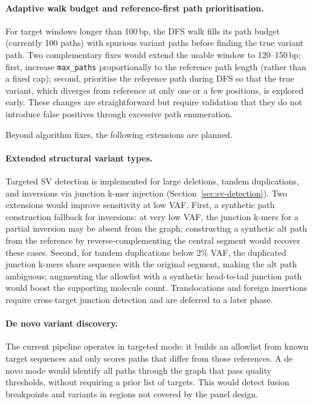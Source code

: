 \paragraph{Adaptive walk budget and reference-first path prioritisation.}
For target windows longer than 100\,bp, the DFS walk fills its path budget
(currently 100 paths) with spurious variant paths before finding the true
variant path.
Two complementary fixes would extend the usable window to 120--150\,bp: first,
increase \texttt{max\_paths} proportionally to the reference path length
(rather than a fixed cap); second, prioritise the reference path during DFS
so that the true variant, which diverges from reference at only one or a few
positions, is explored early.
These changes are straightforward but require validation that they do not
introduce false positives through excessive path enumeration.

Beyond algorithm fixes, the following extensions are planned.

\paragraph{Extended structural variant types.}
Targeted SV detection is implemented for large deletions, tandem duplications,
and inversions via junction k-mer injection (Section~\ref{sec:sv-detection}).
Two extensions would improve sensitivity at low VAF. First, a synthetic path
construction fallback for inversions: at very low VAF, the junction k-mers for
a partial inversion may be absent from the graph; constructing a synthetic
alt path from the reference by reverse-complementing the central segment
would recover these cases. Second, for tandem duplications below 2\% VAF,
the duplicated junction k-mers share sequence with the original segment, making
the alt path ambiguous; augmenting the allowlist with a synthetic head-to-tail
junction path would boost the supporting molecule count. Translocations and
foreign insertions require cross-target junction detection and are deferred to
a later phase.

\paragraph{De novo variant discovery.}
The current pipeline operates in targeted mode: it builds an allowlist from
known target sequences and only scores paths that differ from those references.
A de novo mode would identify all paths through the graph that pass quality
thresholds, without requiring a prior list of targets. This would detect
fusion breakpoints and variants in regions not covered by the panel design.


